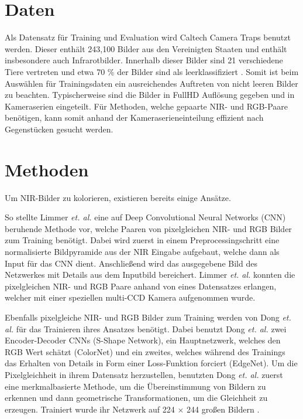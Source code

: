 \documentclass[runningheads]{llncs}
\begin{document}
\section{Daten}
Als Datensatz für Training und Evaluation wird Caltech Camera Traps \cite*{caltech} benutzt werden. 
Dieser enthält 243,100 Bilder aus den Vereinigten Staaten und enthält insbesondere auch Infrarotbilder.
Innerhalb dieser Bilder sind 21 verschiedene Tiere vertreten und etwa 70 \% der Bilder sind als \glqq leer\grqq  klassifiziert \cite*{caltech}.
Somit ist beim Auswählen für Trainingsdaten ein ausreichendes Auftreten von nicht leeren Bilder zu beachten.  
Typischerweise sind die Bilder in FullHD Auflösung gegeben und in Kameraserien eingeteilt. 
Für Methoden, welche gepaarte NIR- und RGB-Paare benötigen, kann somit anhand der Kameraserieneinteilung effizient nach Gegenstücken gesucht werden.  

\section{Methoden}
Um NIR-Bilder zu kolorieren, existieren bereits einige Ansätze. 

So stellte Limmer \textit{et. al.} eine auf Deep Convolutional Neural Networks (CNN) beruhende Methode vor, 
welche Paaren von pixelgleichen NIR- und RGB Bilder zum Training benötigt. Dabei wird zuerst in einem Preprocessingschritt eine normalisierte Bildpyramide
aus der NIR Eingabe aufgebaut, welche dann als Input für das CNN dient. Anschließend wird das ausgegebene Bild des Netzwerkes mit Details aus dem Inputbild bereichert.
Limmer \textit{et. al.} konnten die pixelgleichen NIR- und RGB Paare anhand von eines Datensatzes erlangen, welcher mit einer speziellen multi-CCD Kamera aufgenommen wurde. \cite{limmer2016infrared}   

Ebenfalls pixelgleiche NIR- und RGB Bilder zum Training werden von Dong \textit{et. al.} für das Trainieren ihres Ansatzes benötigt. 
Dabei benutzt Dong \textit{et. al.} zwei Encoder-Decoder CNNs (\glqq S-Shape Network\grqq), ein Hauptnetzwerk, welches den RGB Wert schätzt (\glqq ColorNet\grqq) und ein zweites, 
welches während des Trainings das Erhalten von Details in Form einer Loss-Funktion forciert (\glqq EdgeNet\grqq). 
Um die Pixelgleichheit in ihrem Datensatz herzustellen, 
benutzten Dong \textit{et. al.} zuerst eine merkmalbasierte Methode, um die Übereinstimmung von Bildern zu erkennen 
und dann geometrische Transformationen, um die Gleichheit zu erzeugen.    
Trainiert wurde ihr Netzwerk auf 224 $\times$ 244 großen Bildern \cite{dong2018infrared}.
\end{document}
